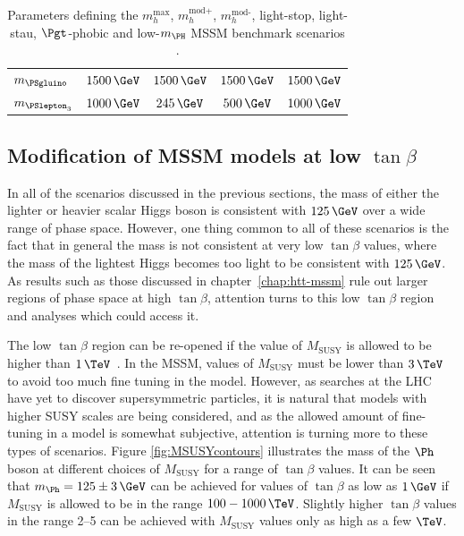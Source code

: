 \begin{table}[tbh]
\begin{tabular}{|l|c|c|c|c|}
$m_{\PSgluino}$ & $1500\,\GeV$ & $1500\,\GeV$  & $1500\,\GeV$ & $1500\,\GeV$ \\
$m_{\PSlepton_{3}}$ & $1000\,\GeV$ & $245\,\GeV$ & $500\,\GeV$ &  $1000\,\GeV$ \\
\hline
\end{tabular}
\caption[Parameters defining the $m_{h}^{\text{max}}$, $m_{h}^{\text{mod+}}$,
$m_{h}^{\text{mod-}}$, light-stop, light-stau, $\Pgt$-phobic and
low-$m_{\PH}$ MSSM benchmark scenarios.]{Parameters defining the $m_{h}^{\text{max}}$, $m_{h}^{\text{mod+}}$,
$m_{h}^{\text{mod-}}$, light-stop, light-stau, $\Pgt$-phobic and
low-$m_{\PH}$ MSSM benchmark scenarios \cite{HIG-13-021}.}
\label{tab:mssmbenchmarks}
\end{table}

\subsection{Modification of MSSM models at low $\tan\beta$}
\label{sec:lowtanbscenario}

In all of the scenarios discussed in the previous sections, the mass of either
the lighter or heavier scalar Higgs boson is consistent with $125\,\GeV$ over a
wide range of phase space. However, one thing common to all of these scenarios
is the fact that in general the mass is not consistent at very low $\tan\beta$
values, where the mass of the lightest Higgs becomes too light to be consistent
with $125\,\GeV$. As results such as those discussed in chapter~\ref{chap:htt-mssm} 
rule out larger regions of phase space at high $\tan\beta$, attention turns to this low
$\tan\beta$ region and analyses which could access it.

The low $\tan\beta$ region can be re-opened if the value of $M_{\text{SUSY}}$ is
allowed to be higher than $1\,\TeV$~\cite{Djouadi:2013vqa}. In the \ac{MSSM}, values of
$M_{\text{SUSY}}$ must be lower than $3\,\TeV$ to avoid too much fine tuning in
the model. However, as searches at the LHC have yet to discover supersymmetric
particles, it is natural that models with higher \ac{SUSY} scales are being
considered, and as the allowed amount of fine-tuning in a model is somewhat
subjective, attention is turning more to these types of scenarios. Figure
\ref{fig:MSUSYcontours} illustrates the mass of the $\Ph$ boson at different
choices of $M_{\text{SUSY}}$ for a range of $\tan\beta$ values. It can be seen
that $m_{\Ph} = 125\pm 3\,\GeV$ can be achieved for values of $\tan\beta$ as low
as $1\,\GeV$ if $M_{\text{SUSY}}$ is allowed to be in the range $100-1000\,\TeV$.
Slightly higher $\tan\beta$ values in the range 2--5 can be achieved with
$M_{\text{SUSY}}$ values only as high as a few $\TeV$. 

